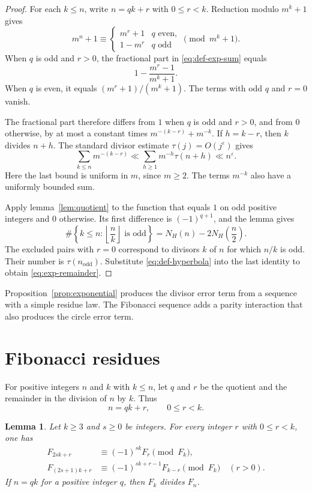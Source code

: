 \documentclass[11pt]{article}
\newtheorem{lemma}[theorem]{Lemma}
\newcommand{\eps}{\varepsilon}
\begin{document}
\begin{proof}
For each $k\leq n$, write $n=qk+r$ with $0\leq r<k$. Reduction modulo
$m^k+1$ gives
\[
 m^n+1\equiv
 \begin{cases}
  m^r+1& q\text{ even},\\
  1-m^r& q\text{ odd}
 \end{cases}
 \pmod {m^k+1}.
\]
When $q$ is odd and $r>0$, the fractional part in
\eqref{eq:def-exp-sum} equals
\[
 1-\frac{m^r-1}{m^k+1}.
\]
When $q$ is even, it equals $(m^r+1)/(m^k+1)$. The terms with odd $q$
and $r=0$ vanish.

The fractional part therefore differs from $1$ when $q$ is odd and $r>0$,
and from $0$ otherwise, by at most a constant times
$m^{-(k-r)}+m^{-k}$. If $h=k-r$, then $k$ divides $n+h$. The standard
divisor estimate $\tau(j)=O(j^\eps)$ gives
\[
 \sum_{k\leq n}m^{-(k-r)}
 \ll \sum_{h\geq 1}m^{-h}\tau(n+h)
 \ll n^\eps.
\]
Here the last bound is uniform in $m$, since $m\geq 2$. The terms $m^{-k}$
also have a uniformly bounded sum.

Apply lemma~\ref{lem:quotient} to the function that equals $1$ on odd
positive integers and $0$ otherwise. Its first difference is $(-1)^{q+1}$,
and the lemma gives
\[
 \#\left\{k\leq n: \left\lfloor\frac nk\right\rfloor
 \text{ is odd}\right\}
 =N_H(n)-2N_H\left(\frac n2\right).
\]
The excluded pairs with $r=0$ correspond to divisors $k$ of $n$ for
which $n/k$ is odd. Their number is $\tau(n_{\mathrm{odd}})$. Substitute
\eqref{eq:def-hyperbola} into the last identity to obtain
\eqref{eq:exp-remainder}.
\end{proof}

Proposition~\ref{prop:exponential} produces the divisor error term from a
sequence with a simple residue law. The Fibonacci sequence adds a parity
interaction that also produces the circle error term.

\section{Fibonacci residues}

For positive integers $n$ and $k$ with $k\leq n$, let $q$ and $r$ be the
quotient and the remainder in the division of $n$ by $k$. Thus
\[
 n=qk+r,\qquad 0\leq r<k.
\]

\begin{lemma}\label{lem:fib-congruence}
Let $k\geq 3$ and $s\geq 0$ be integers. For every integer $r$ with
$0\leq r<k$, one has
\begin{align}
 F_{2sk+r}&\equiv (-1)^{sk}F_r\pmod {F_k},\label{eq:even-q-cong}\\
 F_{(2s+1)k+r}&\equiv (-1)^{sk+r-1}F_{k-r}\pmod {F_k}
 \quad (r>0).\label{eq:odd-q-cong}
\end{align}
If $n=qk$ for a positive integer $q$, then $F_k$ divides $F_n$.
\end{lemma}
\end{document}

